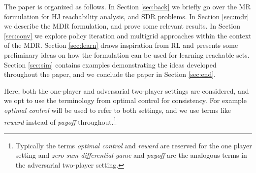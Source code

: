 The paper is organized as follows. In Section \ref{sec:back} we briefly go over the MR formulation for HJ reachability analysis, and SDR problems. In Section \ref{sec:mdr} we describe the MDR formulation, and prove some relevant results. In Section \ref{sec:conv} we explore policy iteration and multigrid approaches within the context of the MDR. Section \ref{sec:learn} draws inspiration from RL and presents some preliminary ideas on how the formulation can be used for learning reachable sets. Section \ref{sec:sim} contains examples demonstrating the ideas developed throughout the paper, and we conclude the paper in Section \ref{sec:end}.

Here, both the one-player and adversarial two-player settings are considered, and we opt to use the terminology from optimal control for consistency. For example \emph{optimal control} will be used to refer to both settings, and we use terms like \emph{reward} instead of \emph{payoff} throughout.\footnote{Typically the terms \emph{optimal control} and \emph{reward} are reserved for the one player setting and \emph{zero sum differential game} and \emph{payoff} are the analogous terms in the adversarial two-player setting.}



